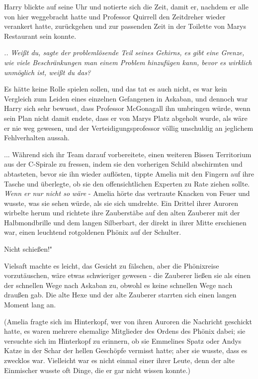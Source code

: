 Harry blickte auf seine Uhr und notierte sich die Zeit, damit er, nachdem er
alle von hier weggebracht hatte und Professor Quirrell den Zeitdreher wieder
verankert hatte, zurückgehen und zur passenden Zeit in der Toilette von Marys
Restaurant sein konnte.

\emph{.. Weißt du, sagte der problemlösende Teil seines Gehirns, es gibt eine Grenze, wie viele Beschränkungen man einem Problem hinzufügen kann, bevor es wirklich unmöglich ist, weißt du das? }

Es hätte keine Rolle spielen sollen, und das tat es auch nicht, es war kein
Vergleich zum Leiden eines einzelnen Gefangenen in Askaban, und dennoch war
Harry sich sehr bewusst, dass Professor McGonagall ihn umbringen würde, wenn
sein Plan nicht damit endete, dass er von Marys Platz abgeholt wurde, als wäre
er nie weg gewesen, und der Verteidigungsprofessor völlig unschuldig an
jeglichem Fehlverhalten aussah.


... Während sich ihr Team darauf vorbereitete, einen weiteren Bissen Territorium
aus der C-Spirale zu fressen, indem sie den vorherigen Schild abschirmten und
abtasteten, bevor sie ihn wieder auflösten, tippte Amelia mit den Fingern auf
ihre Tasche und überlegte, ob sie den offensichtlichen Experten zu Rate ziehen
sollte. \emph{Wenn er nur nicht so wäre} - Amelia hörte das vertraute Knacken
von Feuer und wusste, was sie sehen würde, als sie sich umdrehte. Ein Drittel
ihrer Auroren wirbelte herum und richtete ihre Zauberstäbe auf den alten
Zauberer mit der Halbmondbrille und dem langen Silberbart, der direkt in ihrer
Mitte erschienen war, einen leuchtend rotgoldenen Phönix auf der Schulter.

\glqq Nicht schießen!"

Vielsaft machte es leicht, das Gesicht zu fälschen, aber die Phönixreise
vorzutäuschen, wäre etwas schwieriger gewesen - die Zauberer ließen sie als
einen der schnellen Wege nach Askaban zu, obwohl es keine schnellen Wege nach
draußen gab. Die alte Hexe und der alte Zauberer starrten sich einen langen
Moment lang an.

(Amelia fragte sich im Hinterkopf, wer von ihren Auroren die Nachricht geschickt
hatte, es waren mehrere ehemalige Mitglieder des Ordens des Phönix dabei; sie
versuchte sich im Hinterkopf zu erinnern, ob sie Emmelines Spatz oder Andys
Katze in der Schar der hellen Geschöpfe vermisst hatte; aber sie wusste, dass es
zwecklos war. Vielleicht war es nicht einmal einer ihrer Leute, denn der alte
Einmischer wusste oft Dinge, die er gar nicht wissen konnte.)

